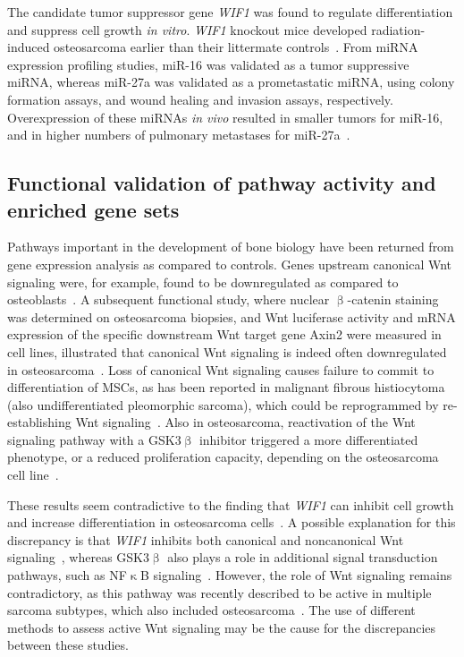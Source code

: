 The candidate tumor suppressor gene {\it WIF1} was found to
regulate differentiation and suppress cell growth {\it in vitro}.
{\it WIF1} knockout mice developed radiation\hyp{}induced osteosarcoma
earlier than their littermate controls~\cite{kansara2009wnt}. From miRNA
expression profiling studies, miR-16 was validated as a tumor
suppressive miRNA, whereas miR-27a was validated as a
prometastatic miRNA, using colony formation assays, and
wound healing and invasion assays, respectively. Overexpression
of these miRNAs {\it in vivo} resulted in smaller tumors for
miR-16, and in higher numbers of pulmonary metastases for
miR-27a~\cite{jones2012mirna}.

\subsection{Functional validation of pathway activity and enriched gene sets}
Pathways important in the development of bone biology have
been returned from gene expression analysis as compared to
controls. Genes upstream canonical Wnt signaling were, for
example, found to be downregulated as compared to osteoblasts~\cite{cleton2009profiling}. A
subsequent functional study, where nuclear $\upbeta$-catenin
staining was determined on osteosarcoma biopsies, and
Wnt luciferase activity and mRNA expression of the specific
downstream Wnt target gene Axin2 were measured in cell
lines, illustrated that canonical Wnt signaling is indeed often
downregulated in osteosarcoma~\cite{cai2010inactive}. Loss of canonical Wnt signaling
causes failure to commit to differentiation of MSCs, as
has been reported in malignant fibrous histiocytoma (also
undifferentiated pleomorphic sarcoma), which could be
reprogrammed by re\hyp{}establishing Wnt signaling~\cite{matushansky2007derivation}. Also in osteosarcoma,
reactivation of the Wnt signaling pathway with a
GSK3$\upbeta$ inhibitor triggered a more differentiated phenotype,
or a reduced proliferation capacity, depending on the osteosarcoma
cell line~\cite{cai2010inactive}.

These results seem contradictive to the finding that {\it WIF1}
can inhibit cell growth and increase differentiation in osteosarcoma
cells~\cite{kansara2009wnt}. A possible explanation for this discrepancy is
that {\it WIF1} inhibits both canonical and noncanonical Wnt signaling~\cite{malinauskas2011modular},
whereas GSK3$\upbeta$ also plays a role in additional signal
transduction pathways, such as NF$\upkappa$B signaling~\cite{tang2012glycogen}. However,
the role of Wnt signaling remains contradictory, as this pathway
was recently described to be active in multiple sarcoma
subtypes, which also included osteosarcoma~\cite{vijayakumar2011high}. The use of
different methods to assess active Wnt signaling may be the
cause for the discrepancies between these studies.


